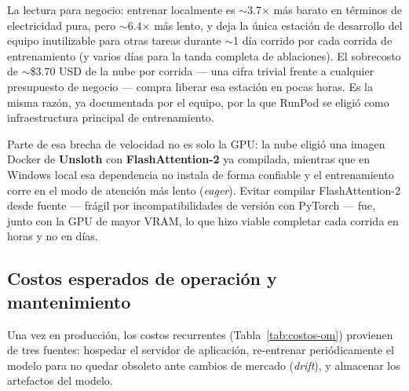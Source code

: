 \documentclass[11pt]{article}
\begin{document}
La lectura para negocio: entrenar localmente es $\sim$3.7$\times$ m\'as barato en t\'erminos de electricidad pura, pero $\sim$6.4$\times$ m\'as lento, y deja la \'unica estaci\'on de desarrollo del equipo inutilizable para otras tareas durante $\sim$1 d\'ia corrido por cada corrida de entrenamiento (y varios d\'ias para la tanda completa de ablaciones). El sobrecosto de $\sim$\$3.70 USD de la nube por corrida --- una cifra trivial frente a cualquier presupuesto de negocio --- compra liberar esa estaci\'on en pocas horas. Es la misma raz\'on, ya documentada por el equipo, por la que RunPod se eligi\'o como infraestructura principal de entrenamiento.

Parte de esa brecha de velocidad no es solo la GPU: la nube eligi\'o una imagen Docker de \textbf{Unsloth} con \textbf{FlashAttention-2} ya compilada, mientras que en Windows local esa dependencia no instala de forma confiable y el entrenamiento corre en el modo de atenci\'on m\'as lento (\textit{eager}). Evitar compilar FlashAttention-2 desde fuente --- fr\'agil por incompatibilidades de versi\'on con PyTorch --- fue, junto con la GPU de mayor VRAM, lo que hizo viable completar cada corrida en horas y no en d\'ias.

\subsection{Costos esperados de operaci\'on y mantenimiento}

Una vez en producci\'on, los costos recurrentes (Tabla~\ref{tab:costos-om}) provienen de tres fuentes: hospedar el servidor de aplicaci\'on, re-entrenar peri\'odicamente el modelo para no quedar obsoleto ante cambios de mercado (\textit{drift}), y almacenar los artefactos del modelo.
\end{document}
